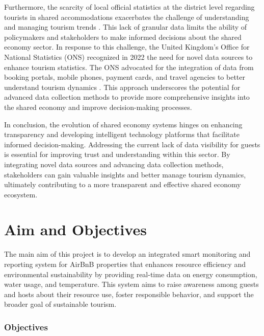 Furthermore, the scarcity of local official statistics at the district level regarding tourists in shared accommodations 
exacerbates the challenge of understanding and managing tourism trends \cite{Johns2007}. This lack of granular data 
limits the ability of policymakers and stakeholders to make informed decisions about the shared economy sector. In 
response to this challenge, the United Kingdom's Office for National Statistics (ONS) recognized in 2022 the need for 
novel data sources to enhance tourism statistics. The ONS advocated for the integration of data from booking portals, 
mobile phones, payment cards, and travel agencies to better understand tourism dynamics \cite{ONS2022}. This approach 
underscores the potential for advanced data collection methods to provide more comprehensive insights into the shared 
economy and improve decision-making processes.

In conclusion, the evolution of shared economy systems hinges on enhancing transparency and developing intelligent 
technology platforms that facilitate informed decision-making. Addressing the current lack of data visibility for guests 
is essential for improving trust and understanding within this sector. By integrating novel data sources and advancing 
data collection methods, stakeholders can gain valuable insights and better manage tourism dynamics, ultimately 
contributing to a more transparent and effective shared economy ecosystem.

\section{Aim and Objectives}

The main aim of this project is to develop an integrated smart monitoring and reporting system for AirBnB properties 
that enhances resource efficiency and environmental sustainability by providing real-time data on energy consumption, 
water usage, and temperature. This system aims to raise awareness among guests and hosts about their resource use, 
foster responsible behavior, and support the broader goal of sustainable tourism.

\subsubsection{Objectives}

